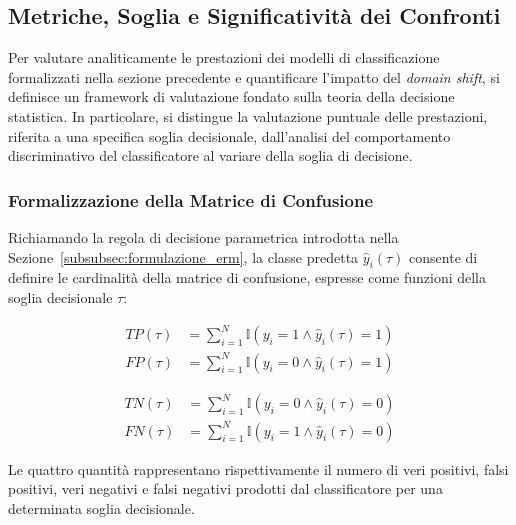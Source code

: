 \subsection{Metriche, Soglia e Significatività dei Confronti}
\label{subsec:metriche_significativita}

Per valutare analiticamente le prestazioni dei modelli di classificazione formalizzati nella sezione precedente e quantificare l'impatto del \textit{domain shift}, si definisce un framework di valutazione fondato sulla teoria della decisione statistica. In particolare, si distingue la valutazione puntuale delle prestazioni, riferita a una specifica soglia decisionale, dall'analisi del comportamento discriminativo del classificatore al variare della soglia di decisione.

\subsubsection{Formalizzazione della Matrice di Confusione}
\label{subsubsec:decisione_parametrica}
Richiamando la regola di decisione parametrica introdotta nella Sezione~\ref{subsubsec:formulazione_erm}, la classe predetta $\hat{y}_i(\tau)$ consente di definire le cardinalità della matrice di confusione, espresse come funzioni della soglia decisionale $\tau$:

\begin{align}
    TP(\tau) &= \sum_{i=1}^{N} \mathbb{I}(y_i=1 \land \hat{y}_i(\tau)=1) \\
    FP(\tau) &= \sum_{i=1}^{N} \mathbb{I}(y_i=0 \land \hat{y}_i(\tau)=1)
\end{align}

\begin{align}
    TN(\tau) &= \sum_{i=1}^{N} \mathbb{I}(y_i=0 \land \hat{y}_i(\tau)=0) \\
    FN(\tau) &= \sum_{i=1}^{N} \mathbb{I}(y_i=1 \land \hat{y}_i(\tau)=0)
\end{align}

Le quattro quantità rappresentano rispettivamente il numero di veri positivi, falsi positivi, veri negativi e falsi negativi prodotti dal classificatore per una determinata soglia decisionale.

